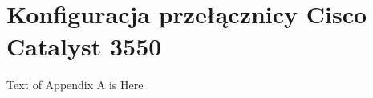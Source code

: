 \newpage
\appendix
\section{\\Konfiguracja przełącznicy Cisco Catalyst 3550} 
\label{App:appendixA}

Text of Appendix A is Here